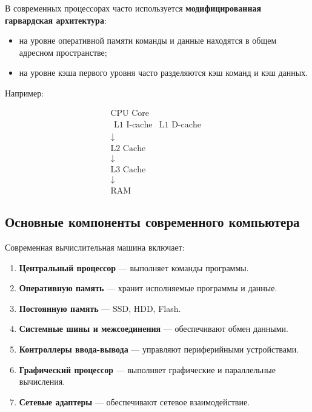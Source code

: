 \documentclass[12pt,a4paper]{article}
\theoremstyle{remark}
\begin{document}
В современных процессорах часто используется \textbf{модифицированная гарвардская архитектура}:
\begin{itemize}
    \item на уровне оперативной памяти команды и данные находятся в общем адресном пространстве;
    \item на уровне кэша первого уровня часто разделяются кэш команд и кэш данных.
\end{itemize}

Например:

\[
\begin{array}{ccc}
 & \boxed{\text{CPU Core}} & \\
 & \begin{array}{cc}
        \boxed{\text{L1 I-cache}} & \boxed{\text{L1 D-cache}}
   \end{array} & \\
 & \downarrow & \\
 & \boxed{\text{L2 Cache}} & \\
 & \downarrow & \\
 & \boxed{\text{L3 Cache}} & \\
 & \downarrow & \\
 & \boxed{\text{RAM}} &
\end{array}
\]

\subsection{Основные компоненты современного компьютера}

Современная вычислительная машина включает:

\begin{enumerate}
    \item \textbf{Центральный процессор} --- выполняет команды программы.
    \item \textbf{Оперативную память} --- хранит исполняемые программы и данные.
    \item \textbf{Постоянную память} --- SSD, HDD, Flash.
    \item \textbf{Системные шины и межсоединения} --- обеспечивают обмен данными.
    \item \textbf{Контроллеры ввода-вывода} --- управляют периферийными устройствами.
    \item \textbf{Графический процессор} --- выполняет графические и параллельные вычисления.
    \item \textbf{Сетевые адаптеры} --- обеспечивают сетевое взаимодействие.
\end{enumerate}
\end{document}
